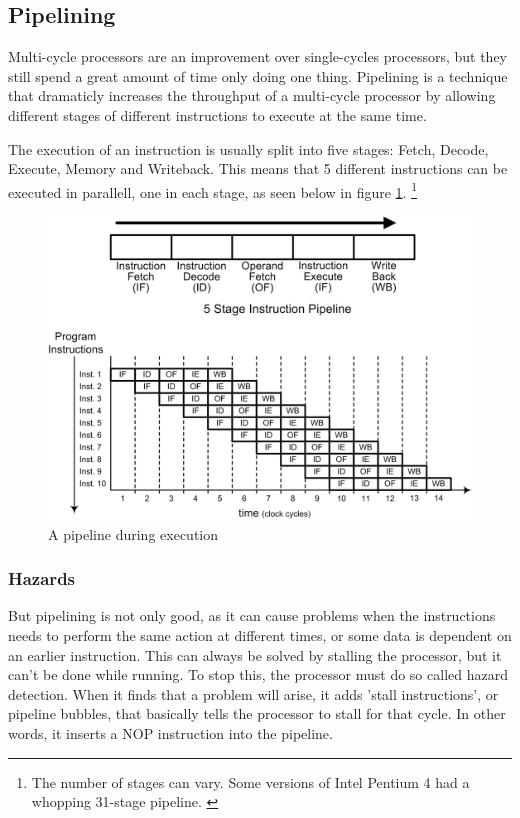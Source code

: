 \subsection{Pipelining}

Multi-cycle processors are an improvement over single-cycles processors, but they still spend a great amount of time only doing one thing.
Pipelining is a technique that dramaticly increases the throughput of a multi-cycle processor by allowing different stages of different instructions to execute at the same time.

The execution of an instruction is usually split into five stages:
Fetch, Decode, Execute, Memory and Writeback. 
This means that 5 different instructions can be executed in parallell,
one in each stage, as seen below in figure \ref{fig:pipeline}.
\footnote{
    The number of stages can vary.
    Some versions of Intel Pentium 4 had a whopping 31-stage pipeline.
    \cite{wiki-pentium4}
}

\begin{figure}[ht]
    \centering
    \includegraphics[width=\textwidth]{figures/pipeline2.png}
    \caption{A pipeline during execution} 
    \label{fig:pipeline}
\end{figure}

\subsubsection*{Hazards}
But pipelining is not only good, as it can cause problems when the instructions
needs to perform the same action at different times, or some data is dependent
on an earlier instruction. This can always be solved by stalling the processor, 
but it can't be done while running. To stop this, the processor must do so called 
hazard detection. When it finds that a problem will arise, it adds 'stall 
instructions', or pipeline bubbles, that basically tells the processor to stall 
for that cycle. In other words, it inserts a NOP instruction into the
pipeline.\cite{hazards-lecture}

